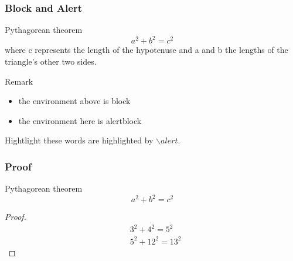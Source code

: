     \begin{frame}
        \frametitle{Block and Alert}
            
        \vspace{-1.1cm}

        \begin{block}{Pythagorean theorem}
            \vspace*{-\baselineskip}\setlength\belowdisplayshortskip{0.6pt}
            $$a^2 + b^2 = c^2$$
            where c represents the length of the hypotenuse and 
            a and b the lengths of the triangle's other two sides.
        \end{block}
        
        \begin{alertblock}{Remark}
            \begin{itemize}
                \item the environment above is \alert{block}
                \item the environment here is \alert{alertblock}
            \end{itemize}
        \end{alertblock}

        \alert{Hightlight} these words are highlighted by $\backslash alert$.
    \end{frame}

    \begin{frame}
        \frametitle{Proof}

        \begin{block}{Pythagorean theorem}
            \vspace*{-\baselineskip}\setlength\belowdisplayshortskip{0.1pt}
            $$a^2 + b^2 = c^2$$
        \end{block}
        
        \vspace{0.4cm}

        \begin{proof}
            \vspace*{-\baselineskip}\setlength\belowdisplayshortskip{0pt}
            \begin{align*}
                &3^2 + 4^2 = 5^2\\
                &5^2 + 12^2 = 13^2
            \end{align*}
        \end{proof}
        
    \end{frame}

